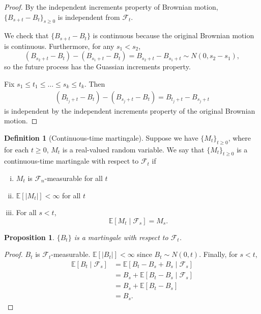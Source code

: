 \documentclass{tufte-handout}
\newcommand*\E{\mathbb{E}}
\newtheorem{prop}[thm]{Proposition}
\theoremstyle{definition}
\newtheorem{defn}[thm]{Definition}
\begin{document}
\begin{proof}
	By the independent increments property of Brownian motion, 
		$\{B_{s+t} - B_t\}_{s\ge 0}$ is independent from $\mathscr{F}_t$. 

	We check that $\{B_{s+t} - B_t\}$ is continuous because the original Brownian motion is continuous. Furthermore, for any $s_1 < s_2$, \[
		\left( B_{s_2+t} - B_t \right) - \left( B_{s_1 + t} - B_t \right) = B_{s_2 + t} - B_{s_1 + t} \sim N(0,s_2-s_1)
	,\] so the future process has the Guassian increments property.

	Fix $s_1\le t_1 \le \ldots \le s_k \le t_k$. Then 
	\begin{align*}
		\left( B_{t_j + t} - B_t \right) - \left( B_{s_j + t} - B_t \right) = B_{t_j + t} - B_{s_j + t}
	\end{align*} is independent by the independent increments property of the original Brownian motion.
\end{proof}

\begin{defn}[Continuous-time martingale]
	Suppose we have $\{M_t\}_{t\ge 0}$, where for each $t\ge 0$, $M_t$ is a real-valued random variable. We say that $\{M_t\}_{t\ge 0}$ is a continuous-time martingale with respect to $\mathscr{F}_t$ if
	\begin{enumerate}[(i)]
		\item $M_t$ is $\mathscr{F}_n$-measurable for all $t$
		\item $\E\left[\left| M_t \right|\right] <\infty$ for all $t$
		\item For all $s < t$, \[
			\E\left[M_t \mid \mathscr{F}_s\right] = M_s
		.\] 
	\end{enumerate}
\end{defn}

\begin{prop}
	$\{B_t\}$ is a martingale with respect to $\mathscr{F}_t$.
\end{prop}

\begin{proof}
	$B_t$ is $\mathscr{F}_t$-measurable. $\E\left[\left| B_t \right|\right] < \infty$ since $B_t \sim N(0,t)$. Finally, for $s < t$,
	\begin{align*}
		\E\left[B_t \mid \mathscr{F}_s\right] &= \E\left[B_t - B_s + B_s \mid \mathscr{F}_s\right]  \\
											  &= B_s + \E\left[B_t - B_s \mid \mathscr{F}_s \right] \\
											  &= B_s + \E\left[B_t - B_s\right] \\
											  &= B_s
	.\end{align*}
\end{proof}
\end{document}
